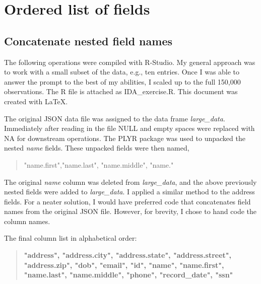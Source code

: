 \documentclass[12pt,fleqn]{report} %
\begin{document}

\pagestyle{empty} %

\tableofcontents %





\chapter{Ordered list of fields}


\section{Concatenate nested field names}
The following operations were compiled with R-Studio. My general approach was to work with a small subset of the data, e.g., ten entries. Once I was able to answer the prompt to the best of my abilities, I scaled up to the full 150,000 observations. The R file is attached as IDA\_exercise.R. This document was created with \LaTeX. 

The original JSON data file was assigned to the data frame \textit{large\_data}. Immediately after reading in the file NULL and empty spaces were replaced with NA for downstream operations.  The PLYR package was used to unpacked the nested \textit{name} fields. These unpacked fields were then named, 
\begin{quote}
"name.first","name.last", "name.middle", "name."
\end{quote}
The original \textit{name} column was deleted from \textit{large\_data}, and the above previously nested fields were added to \textit{large\_data}. I applied a similar method to the address fields. For a neater solution, I would have preferred code that concatenates field names from the original JSON file. However, for brevity, I chose to hand code the column names. 

The final column list in alphabetical order: 
\begin{quote}
 \textbf{"address", "address.city", "address.state", "address.street", "address.zip", "dob", "email", "id", "name", "name.first", "name.last", "name.middle", "phone", "record\_date", "ssn" }
\end{quote}
\end{document}
